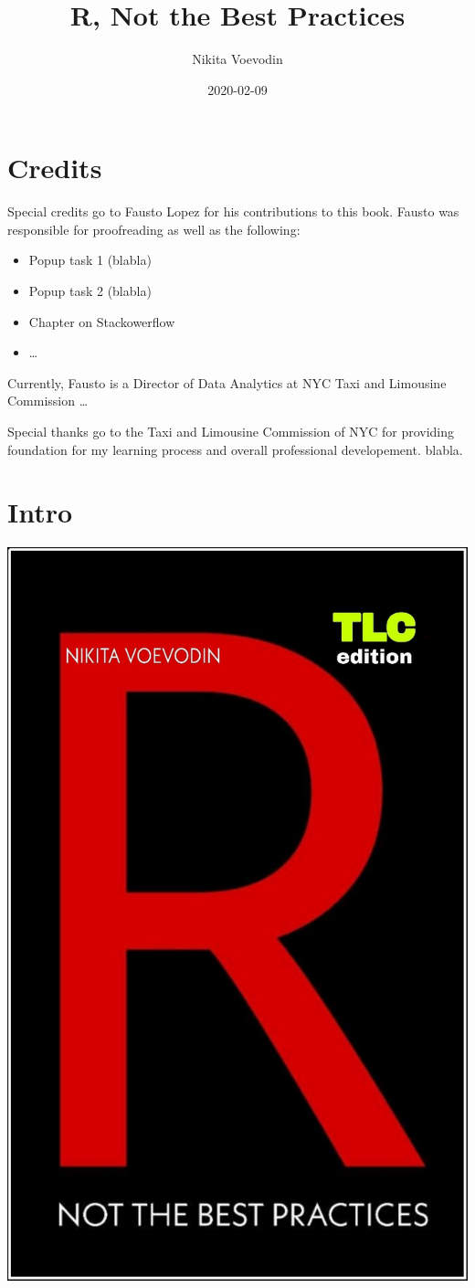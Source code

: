 \documentclass[]{book}
\title{R, Not the Best Practices}
\author{Nikita Voevodin}
\date{2020-02-09}
\providecommand{\tightlist}{%
  \setlength{\itemsep}{0pt}\setlength{\parskip}{0pt}}
\begin{document}
\maketitle

{
\setcounter{tocdepth}{1}
\tableofcontents
}
\hypertarget{credits}{%
\chapter{Credits}\label{credits}}

Special credits go to Fausto Lopez for his contributions to this book. Fausto was responsible for proofreading as well as the following:

\begin{itemize}
\tightlist
\item
  Popup task 1 (blabla)
\item
  Popup task 2 (blabla)
\item
  Chapter on Stackowerflow
\item
  \ldots{}
\end{itemize}

Currently, Fausto is a Director of Data Analytics at NYC Taxi and Limousine Commission \ldots{}

Special thanks go to the Taxi and Limousine Commission of NYC for providing foundation for my learning process and overall professional developement. blabla.

\hypertarget{intro}{%
\chapter{Intro}\label{intro}}

\includegraphics[width=0.65\linewidth,style="float:right; padding:10px"]{R}
\end{document}

